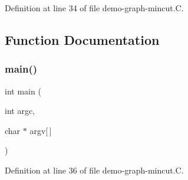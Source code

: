 Definition at line 34 of file demo-\/graph-\/mincut.\+C.



\subsection{Function Documentation}
\mbox{\label{demo-graph-mincut_8_c_a0ddf1224851353fc92bfbff6f499fa97}} 
\subsubsection{\texorpdfstring{main()}{main()}}
{\footnotesize\ttfamily int main (\begin{DoxyParamCaption}\item[{int}]{argc,  }\item[{char $\ast$}]{argv\mbox{[}$\,$\mbox{]} }\end{DoxyParamCaption})}



Definition at line 36 of file demo-\/graph-\/mincut.\+C.

